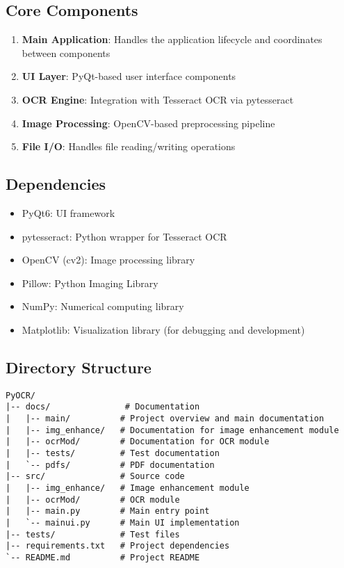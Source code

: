 \documentclass[12pt]{article}
\begin{document}
\subsection{Core Components}
\begin{enumerate}
    \item \textbf{Main Application}: Handles the application lifecycle and coordinates between components
    \item \textbf{UI Layer}: PyQt-based user interface components
    \item \textbf{OCR Engine}: Integration with Tesseract OCR via pytesseract
    \item \textbf{Image Processing}: OpenCV-based preprocessing pipeline
    \item \textbf{File I/O}: Handles file reading/writing operations
\end{enumerate}

\subsection{Dependencies}
\begin{itemize}
    \item PyQt6: UI framework
    \item pytesseract: Python wrapper for Tesseract OCR
    \item OpenCV (cv2): Image processing library
    \item Pillow: Python Imaging Library
    \item NumPy: Numerical computing library
    \item Matplotlib: Visualization library (for debugging and development)
\end{itemize}

\subsection{Directory Structure}
\begin{lstlisting}
PyOCR/
|-- docs/               # Documentation
|   |-- main/          # Project overview and main documentation
|   |-- img_enhance/   # Documentation for image enhancement module
|   |-- ocrMod/        # Documentation for OCR module
|   |-- tests/         # Test documentation
|   `-- pdfs/          # PDF documentation
|-- src/               # Source code
|   |-- img_enhance/   # Image enhancement module
|   |-- ocrMod/        # OCR module
|   |-- main.py        # Main entry point
|   `-- mainui.py      # Main UI implementation
|-- tests/             # Test files
|-- requirements.txt   # Project dependencies
`-- README.md          # Project README
\end{lstlisting}
\end{document}
